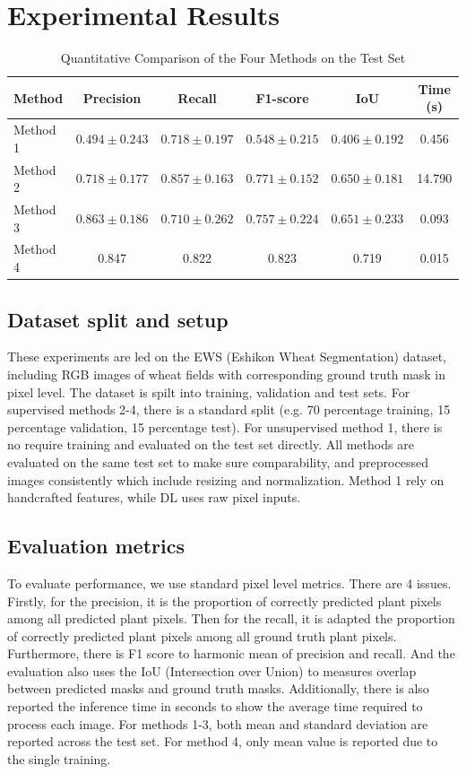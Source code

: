 \documentclass[conference]{IEEEtran}
\begin{document}
\section{Experimental Results}
\begin{table}[t]
\centering
\caption{Quantitative Comparison of the Four Methods on the Test Set}
\label{tab}

\begin{tabular}{lccccc}
\toprule
Method & Precision & Recall & F1-score & IoU & Time (s) \\
\midrule
Method 1 & $0.494 \pm 0.243$ & $0.718 \pm 0.197$ & $0.548 \pm 0.215$ & $0.406 \pm 0.192$ & 0.456 \\
Method 2 & $0.718 \pm 0.177$ & $0.857 \pm 0.163$ & $0.771 \pm 0.152$ & $0.650 \pm 0.181$ & 14.790 \\
Method 3 & $0.863 \pm 0.186$ & $0.710 \pm 0.262$ & $0.757 \pm 0.224$ & $0.651 \pm 0.233$ & 0.093 \\
Method 4 & 0.847 & 0.822 & 0.823 & 0.719 & 0.015 \\
\bottomrule
\end{tabular}

\end{table}
\subsection{Dataset split and setup }
These experiments are led on the EWS (Eshikon Wheat Segmentation) dataset, including RGB images of wheat fields with corresponding ground truth mask in pixel level. 
The dataset is spilt into training, validation and test sets. For supervised methods 2-4, there is a standard split (e.g. 70 percentage training, 15 percentage validation, 15 percentage test). For unsupervised method 1, there is no require training and evaluated on the test set directly. 
All methods are evaluated on the same test set to make sure comparability, and preprocessed images consistently which include resizing and normalization. Method 1 rely on handcrafted features, while DL uses raw pixel inputs. 

\subsection{Evaluation metrics }
To evaluate performance, we use standard pixel level metrics. There are 4 issues. Firstly, for the precision, it is the proportion of correctly predicted plant pixels among all predicted plant pixels. Then for the recall, it is adapted the proportion of correctly predicted plant pixels among all ground truth plant pixels. Furthermore, there is F1 score to harmonic mean of precision and recall. And the evaluation also uses the IoU (Intersection over Union) to measures overlap between predicted masks and ground truth masks. Additionally, there is also reported the inference time in seconds to show the average time required to process each image. 
For methods 1-3, both mean and standard deviation are reported across the test set. For method 4, only mean value is reported due to the single training. 
\end{document}
